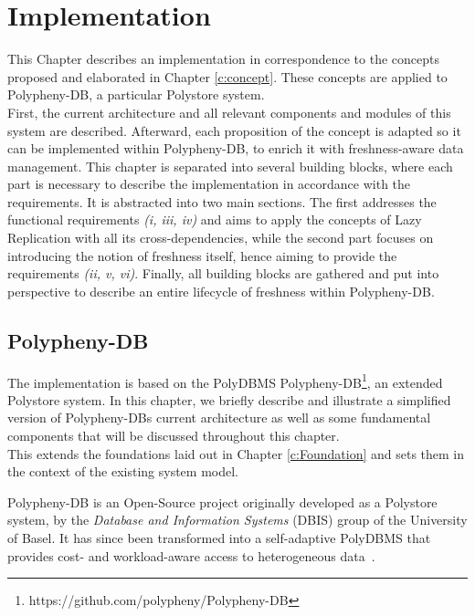 \chapter{Implementation}
\label{c:implementation}

This Chapter describes an implementation in correspondence to the concepts proposed and elaborated in Chapter \ref{c:concept}. 
These concepts are applied to Polypheny-DB, a particular Polystore system.\\
First, the current architecture and all relevant components and modules of this system are described. Afterward, each proposition of the concept is adapted
so it can be implemented within Polypheny-DB, to enrich it with freshness-aware data management.
This chapter is separated into several building blocks, where each part is necessary to describe the implementation in accordance with the requirements.
It is abstracted into two main sections. The first addresses the functional requirements \textit{(i, iii, iv)} and aims to apply the concepts of Lazy Replication with all its
cross-dependencies, while the second part focuses on introducing the notion of freshness itself, hence aiming to provide the requirements \textit{(ii, v, vi)}.
Finally, all building blocks are gathered and put into perspective to describe an entire lifecycle of freshness within Polypheny-DB. 





\section{Polypheny-DB}
\label{sec:architecture}


The implementation is based on the PolyDBMS Polypheny-DB\footnote{https://github.com/polypheny/Polypheny-DB}, an extended Polystore system.
In this chapter, we briefly describe and illustrate a simplified version of Polypheny-DBs current architecture
as well as some fundamental components that will be discussed throughout this chapter.\\
This extends the foundations laid out in Chapter \ref{c:Foundation} and sets them in the context of the existing system model.




Polypheny-DB is an Open-Source project originally developed as a Polystore system, by 
the \textit{Database and Information Systems} (DBIS) group of the University of Basel.
It has since been transformed into a self-adaptive PolyDBMS that provides cost- and workload-aware access to heterogeneous data~\cite{poly2020}.

